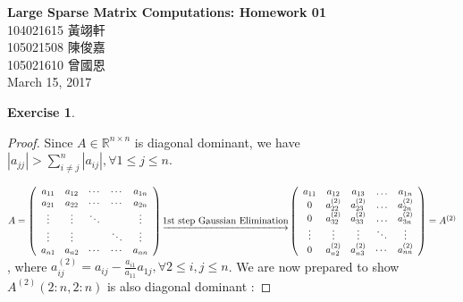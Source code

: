 \documentclass[11pt,a4paper]{article}
\renewcommand{\(}{\left(}
\renewcommand{\)}{\right)}
\renewcommand{\title}{Large Sparse Matrix Computations: Homework 01}
\renewcommand{\author}{104021615 黃翊軒\\105021508	陳俊嘉\\105021610 曾國恩}
\renewcommand{\maketitle}{\begin{center}\textbf{\Large\title}\\[6pt] {\author}\\[6pt] {\color{Gray}\footnotesize March 15, 2017}\end{center}}
\newtheorem{exercise}{Exercise}
\begin{document}
  \maketitle
  
  \setcounter{exercise}{0}
  
  \begin{exercise}
  \end{exercise}  
  \begin{proof}
  	Since $A\in%
  	\mathbb{R}
  	^{n\times n}$ is diagonal dominant, we have $\left\vert a_{jj}\right\vert
  	>\sum\limits_{i\neq j}^{n}\left\vert a_{ij}\right\vert ,\forall1\leq j\leq n$.
  	
  	$A=\left(
  	\begin{array}
  	[c]{ccccc}%
  	a_{11} & a_{12} & \cdots & \cdots & a_{1n}\\
  	a_{21} & a_{22} & \cdots & \cdots & a_{2n}\\
  	\vdots & \vdots & \ddots &  & \vdots\\
  	\vdots & \vdots &  & \ddots & \vdots\\
  	a_{n1} & a_{n2} & \cdots & \cdots & a_{nn}%
  	\end{array}
  	\right)  \underrightarrow{\text{1st step Gaussian Elimination}}\left(
  	\begin{array}
  	[c]{ccccc}%
  	a_{11} & a_{12} & a_{13} & \ldots & a_{1n}\\
  	0 & a_{22}^{(2)} & a_{23}^{(2)} & \ldots & a_{2n}^{(2)}\\
  	0 & a_{32}^{(2)} & a_{33}^{(2)} & \ldots & a_{3n}^{(2)}\\
  	\vdots & \vdots & \vdots & \ddots & \vdots\\
  	0 & a_{n2}^{(2)} & a_{n3}^{(2)} & \cdots & a_{nn}^{(2)}%
  	\end{array}
  	\right)  =A^{(2)}$, where $a_{ij}^{(2)}=a_{ij}-\frac{a_{i1}}{a_{11}}%
  	a_{1j},\forall2\leq i,j\leq n$. We are now prepared to show $A^{(2)}(2:n,2:n)$
  	is also diagonal dominant : 
  	

\end{proof}
\end{document}
